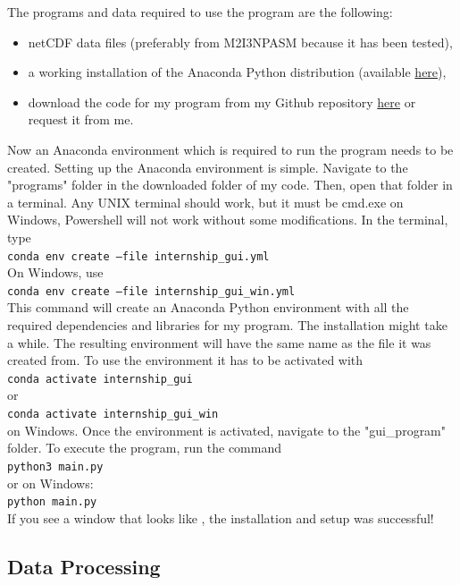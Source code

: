 \documentclass[../00_main.tex]{subfiles}
\begin{document}
The programs and data required to use the program are the following:
\begin{itemize}
    \item netCDF data files (preferably from M2I3NPASM because it has been
        tested),
    \item a working installation of the Anaconda Python distribution (available
        \href{https://www.anaconda.com/products/individual}{here}),
    \item download the code for my program from my Github repository 
        \href{https://github.com/moritz-konarski/internship}{here} or request
        it from me.
\end{itemize}
Now an Anaconda environment which is required to run the program needs to be
created. Setting up the Anaconda environment is simple. Navigate to the 
"programs" folder in the downloaded folder of my code. Then, open that folder 
in a terminal. Any UNIX terminal should work, but it must be cmd.exe on 
Windows, Powershell will not work without some modifications. In the terminal, 
type\\
\texttt{conda env create --file internship\_gui.yml}\\
\noindent
On Windows, use\\
\texttt{conda env create --file internship\_gui\_win.yml}\\
\noindent
This command will create an Anaconda Python environment with all the required 
dependencies and libraries for my program. The installation might take a while. 
The resulting environment will have the same name as the file it was created 
from. To use the environment it has to be activated with\\
\texttt{conda activate internship\_gui} \\
\noindent
or \\
\texttt{conda activate internship\_gui\_win}\\
\noindent
on Windows. Once the environment is activated, navigate to the "gui\_program" 
folder. To execute the program, run the command\\
\texttt{python3 main.py}\\
\noindent
or on Windows:\\
\texttt{python main.py}\\
\noindent
If you see a window that looks like , the installation and setup 
was successful!

\subsection{Data Processing}
\end{document}
